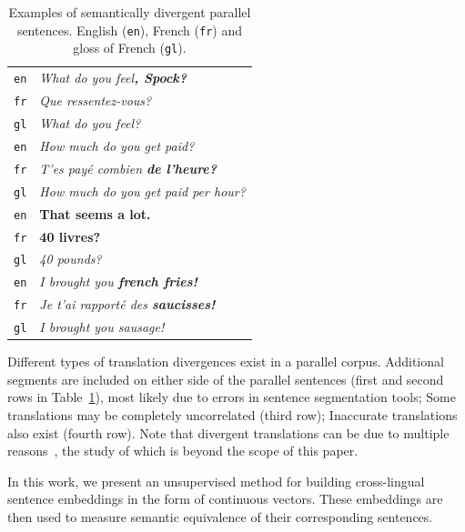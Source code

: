 \documentclass[11pt,a4paper]{article}
\begin{document}
\begin{table}[ht]
\small
\center
\begin{tabular}{ c|l }
  \hline  
  \texttt{en} & \it{What do you feel}\bf{, Spock}\it{?} \\
  \texttt{fr} & \it{Que ressentez-vous?} \\
  \texttt{gl} & {\small \it{What do you feel?}} \\
  \hline
  \texttt{en} & \it{How much do you get paid?} \\
  \texttt{fr} & \it{T'es pay\'e combien} \bf{de l'heure}\it{?} \\
  \texttt{gl} & {\small \it{How much do you get paid per hour?}} \\
  \hline  
  \texttt{en} &  \bf{That seems a lot.} \\
  \texttt{fr} & \bf{40 livres?} \\
  \texttt{gl} & {\small \it{40 pounds?}} \\
  \hline  
  \texttt{en} & \it{I brought you} \bf{french fries}\it{!} \\
  \texttt{fr} & \it{Je t'ai rapport\'e des} \bf{saucisses}\it{!} \\
  \texttt{gl} & {\small \it{I brought you sausage!}} \\
  \hline
\end{tabular}
\caption[Table caption text]{Examples of semantically divergent parallel sentences. English (\texttt{en}), French (\texttt{fr}) and gloss of French (\texttt{gl}).}
\label{tab:examples}
\end{table}

Different types of translation divergences exist in a parallel corpus.
Additional segments are included on either side of the parallel
sentences (first and second rows in Table~\ref{tab:examples}), most likely due to errors in sentence segmentation tools;
Some translations may be completely uncorrelated (third row);
Inaccurate translations also exist (fourth row). 
Note that divergent translations can be due to multiple reasons~\cite{C14-1055}, the study of which is beyond the scope of this paper. 

In this work, we present an unsupervised method for building cross-lingual sentence embeddings in the form of continuous vectors. 
These embeddings are then used to measure semantic equivalence of their corresponding sentences.
\end{document}
